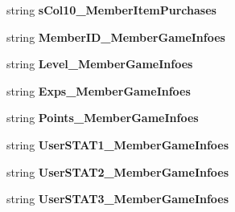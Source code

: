 \begin{DoxyCompactItemize}
\item 
string {\bfseries s\+Col10\+\_\+\+Member\+Item\+Purchases}\hypertarget{a00113_ab6c046bc2449178326e53e0a4192c02f}{}\label{a00113_ab6c046bc2449178326e53e0a4192c02f}

\item 
string {\bfseries Member\+I\+D\+\_\+\+Member\+Game\+Infoes}\hypertarget{a00113_a09d68c27a1f41155b40d0c5873d82027}{}\label{a00113_a09d68c27a1f41155b40d0c5873d82027}

\item 
string {\bfseries Level\+\_\+\+Member\+Game\+Infoes}\hypertarget{a00113_a50a4fc57433b98e740b6cf985344e789}{}\label{a00113_a50a4fc57433b98e740b6cf985344e789}

\item 
string {\bfseries Exps\+\_\+\+Member\+Game\+Infoes}\hypertarget{a00113_a84606e68e2fdc5d71d067acc92e5755a}{}\label{a00113_a84606e68e2fdc5d71d067acc92e5755a}

\item 
string {\bfseries Points\+\_\+\+Member\+Game\+Infoes}\hypertarget{a00113_a4f31fbb745024b42b6824768d62ccd93}{}\label{a00113_a4f31fbb745024b42b6824768d62ccd93}

\item 
string {\bfseries User\+S\+T\+A\+T1\+\_\+\+Member\+Game\+Infoes}\hypertarget{a00113_a39057f547eeeac00225ecafe317a0e1a}{}\label{a00113_a39057f547eeeac00225ecafe317a0e1a}

\item 
string {\bfseries User\+S\+T\+A\+T2\+\_\+\+Member\+Game\+Infoes}\hypertarget{a00113_a08acf79f43bc2d72b3dc1802ecef3d52}{}\label{a00113_a08acf79f43bc2d72b3dc1802ecef3d52}

\item 
string {\bfseries User\+S\+T\+A\+T3\+\_\+\+Member\+Game\+Infoes}\hypertarget{a00113_a9058334e379702d27af3cc11740fb3b9}{}\label{a00113_a9058334e379702d27af3cc11740fb3b9}


\end{DoxyCompactItemize}
